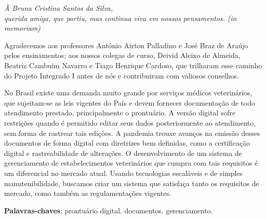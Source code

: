 \documentclass[
    12pt,               %
    openright,          %
    oneside,
    a4paper,            %
    BIBLATEX,           %
    TODO,               %
    english,            %
    brazil              %
    ]{ifsp-spo-inf-ctds}
\begin{document}
 
\frenchspacing 

\pretextual

\imprimircapa
\imprimirfolhaderosto

\begin{dedicatoria}
   \vspace*{\fill}
   \centering
   \noindent
   \textit{ À Bruna Cristina Santos da Silva,\\
   querida amiga, que partiu, mas continua viva em nossos pensamentos. (in memoriam)} 


   \vspace*{\fill}


\end{dedicatoria}
\begin{agradecimentos}
    Agradecemos aos professores Antônio Airton Palladino e José Braz de Araújo pelos ensinamentos;
    aos nossos colegas de curso, Deivid Aleixo de Almeida, Beatriz Cambuim Navarro e Tiago Henrique Cardoso, que trilharam esse caminho do Projeto Integrado I antes de nós e contribuiram com valiosos conselhos.

    

\end{agradecimentos}



\setlength{\absparsep}{18pt} %
\begin{resumo}

No Brasil existe uma demanda muito grande por serviços médicos veterinários, que sujeitam-se as leis vigentes do País e devem fornecer documentação de todo atendimento prestado, principalmente o prontuário. A versão digital sofre restrições quando é permitido editar seus dados posteriormente ao atendimento, sem forma de rastrear tais edições. A pandemia trouxe avanços na emissão desses documentos de forma digital com diretrizes bem definidas, como a certificação digital e rastreabilidade de alterações. O desenvolvimento de um sistema de gerenciamento de estabelecimentos veterinários que cumpra com tais requisitos é um diferencial no mercado atual. Usando tecnologias escaláveis e de simples manutenibilidade, buscamos criar um sistema que satisfaça tanto os requisitos de mercado, como também as regulamentações vigentes. 

\textbf{Palavras-chaves}: prontuário digital. documentos. gerenciamento.
\end{resumo}
\end{document}
